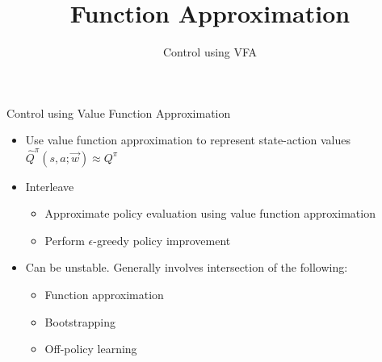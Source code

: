 


\title[RL: Function Approximation]{Function Approximation}
\subtitle{Control using VFA}



	
	\maketitle

\begin{frame}[c]{Control using Value Function Approximation}
	
	\begin{itemize}
		\item Use value function approximation to represent state-action values $\hat{Q}^\pi(s,a;\vec{w}) \approx Q^\pi$
		\item Interleave
		\begin{itemize}
			\item Approximate policy evaluation using value function approximation
			\item Perform $\epsilon$-greedy policy improvement
		\end{itemize}
		\item Can be unstable. Generally involves intersection of the following:
		\begin{itemize}
			\item Function approximation
			\item Bootstrapping
			\item \alert{Off-policy learning}
		\end{itemize}
	\end{itemize}

\end{frame}
